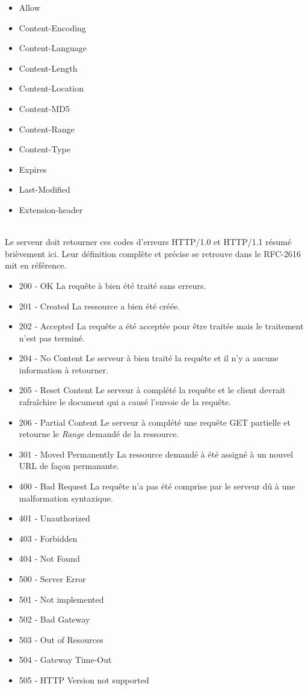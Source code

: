 \documentclass{scrreprt}
\begin{document}
        \begin{itemize}
        \item Allow                   
        \item Content-Encoding     
        \item Content-Language     
        \item Content-Length       
        \item Content-Location     
        \item Content-MD5          
        \item Content-Range        
        \item Content-Type         
        \item Expires              
        \item Last-Modified        
        \item Extension-header
        \end{itemize}
\\
 
Le serveur doit retourner ces codes d'erreurs HTTP/1.0 et HTTP/1.1 résumé brièvement ici. Leur définition complète et précise se retrouve dans le RFC-2616 mit en référence. \\
 \begin{itemize}
 \item 200 - OK
 \subitem La requête à bien été traité sans erreurs.
 \item 201 - Created
 \subitem La ressource a bien été créée.
 \item 202 - Accepted
 \subitem La requête a été acceptée pour être traitée mais le traitement n'est pas terminé.
 \item 204 - No Content
 \subitem Le serveur à bien traité la requête et il n'y a aucune information à retourner.
 \item 205 - Reset Content
 \subitem Le serveur à complété la requête et le client devrait rafraîchire le document qui a causé l'envoie de la requête.
 \item 206 - Partial Content
 \subitem Le serveur à complété une requête GET partielle et retourne le \textit{Range} demandé de la ressource.
 \item 301 - Moved Permanently
 \subitem La ressource demandé à été assigné à un nouvel URL de façon permanante.
 \item 400 - Bad Request
 \subitem La requête n'a pas été comprise par le serveur dû à une malformation syntaxique. 
 \item 401 - Unauthorized
 \subitem 
 \item 403 - Forbidden
 \item 404 - Not Found
 \item 500 - Server Error

 \item 501 - Not implemented
 \item 502 - Bad Gateway
 \item 503 - Out of Resources
 \item 504 - Gateway Time-Out
 \item 505 - HTTP Version not supported

 \end{itemize}
\end{document}
